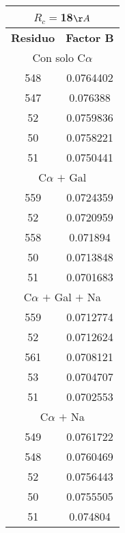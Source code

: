 \begin{tabular}[c]{|c|c|}
\multicolumn{2}{c}{$R_c=$18$\AA$}\\\hline
\textbf{Residuo}&\textbf{Factor B}\\\hline
\multicolumn{2}{c}{Con solo C$\alpha$}\\\hline
       548& 0.0764402\\
       547&  0.076388\\
        52& 0.0759836\\
        50& 0.0758221\\
        51& 0.0750441\\\hline
\multicolumn{2}{c}{C$\alpha$ $+$ Gal}\\\hline
       559& 0.0724359\\
        52& 0.0720959\\
       558&  0.071894\\
        50& 0.0713848\\
        51& 0.0701683\\\hline
\multicolumn{2}{c}{C$\alpha$ $+$ Gal $+$ Na}\\\hline
       559& 0.0712774\\
        52& 0.0712624\\
       561& 0.0708121\\
        53& 0.0704707\\
        51& 0.0702553\\\hline
\multicolumn{2}{c}{C$\alpha$ $+$ Na}\\\hline
       549& 0.0761722\\
       548& 0.0760469\\
        52& 0.0756443\\
        50& 0.0755505\\
        51&  0.074804\\\hline
\end{tabular}
